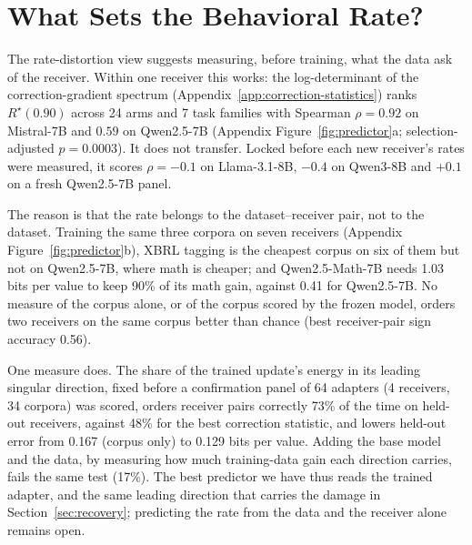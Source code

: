 \section{What Sets the Behavioral Rate?}
\label{sec:behavior-prediction}

The rate-distortion view suggests measuring, before training, what the data ask of the receiver. Within one receiver this works: the log-determinant of the correction-gradient spectrum (Appendix~\ref{app:correction-statistics}) ranks $R^\star(0.90)$ across 24 arms and 7 task families with Spearman $\rho=0.92$ on Mistral-7B and $0.59$ on Qwen2.5-7B (Appendix Figure~\ref{fig:predictor}a; selection-adjusted $p=0.0003$). It does not transfer. Locked before each new receiver's rates were measured, it scores $\rho=-0.1$ on Llama-3.1-8B, $-0.4$ on Qwen3-8B and $+0.1$ on a fresh Qwen2.5-7B panel.

The reason is that the rate belongs to the dataset--receiver pair, not to the dataset. Training the same three corpora on seven receivers (Appendix Figure~\ref{fig:predictor}b), XBRL tagging is the cheapest corpus on six of them but not on Qwen2.5-7B, where math is cheaper; and Qwen2.5-Math-7B needs 1.03 bits per value to keep 90\% of its math gain, against 0.41 for Qwen2.5-7B. No measure of the corpus alone, or of the corpus scored by the frozen model, orders two receivers on the same corpus better than chance (best receiver-pair sign accuracy 0.56).

One measure does. The share of the trained update's energy in its leading singular direction, fixed before a confirmation panel of 64 adapters (4 receivers, 34 corpora) was scored, orders receiver pairs correctly 73\% of the time on held-out receivers, against 48\% for the best correction statistic, and lowers held-out error from 0.167 (corpus only) to 0.129 bits per value. Adding the base model and the data, by measuring how much training-data gain each direction carries, fails the same test (17\%). The best predictor we have thus reads the trained adapter, and the same leading direction that carries the damage in Section~\ref{sec:recovery}; predicting the rate from the data and the receiver alone remains open.
